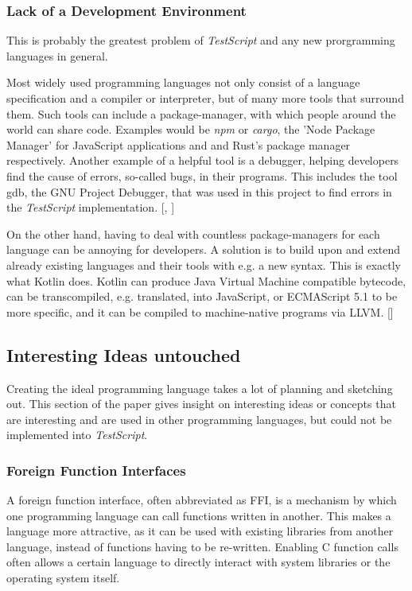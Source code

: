 \documentclass[12pt,a4paper]{article}
\newcommand{\name}{\emph{TestScript}}
\begin{document}
\subsubsection{Lack of a Development Environment}
This is probably the greatest problem of \name{} and any new prorgramming
languages in general.

Most widely used programming languages not only consist
of a language specification and a compiler or interpreter, but of many more
tools that surround them.
Such tools can include a package-manager, with which people around the world
can share code. Examples would be \emph{npm} or \emph{cargo}, 
the 'Node Package Manager' for JavaScript applications and and Rust's package 
manager respectively.
Another example of a helpful tool is a debugger, helping developers
find the cause of errors, so-called bugs, in their programs.
This includes the tool gdb, the GNU Project Debugger, that was used in this
project to find errors in the \name{} implementation.
[, ]

On the other hand, having to deal with countless package-managers for each
language can be annoying for developers. A solution is to build upon and
extend already existing languages and their tools with e.g. a new syntax.
This is exactly what Kotlin does. Kotlin can produce Java Virtual Machine
compatible bytecode, can be transcompiled, e.g. translated, into
JavaScript, or ECMAScript 5.1 to be more specific,
and it can be compiled to machine-native programs via LLVM. 
[]


\subsection{Interesting Ideas untouched}
Creating the ideal programming language takes a lot of planning and sketching
out. This section of the paper gives insight on interesting ideas or concepts
that are interesting and are used in other programming languages, but 
could not be implemented into \name{}.

\subsubsection{Foreign Function Interfaces}
A foreign function interface, often abbreviated as FFI,
is a mechanism by which one programming language can call functions written 
in another. This makes a language more attractive, as it can be used with
existing libraries from another language, instead of functions having to be
re-written. Enabling C function calls often allows a certain language to
directly interact with system libraries or the operating system itself.
\end{document}
